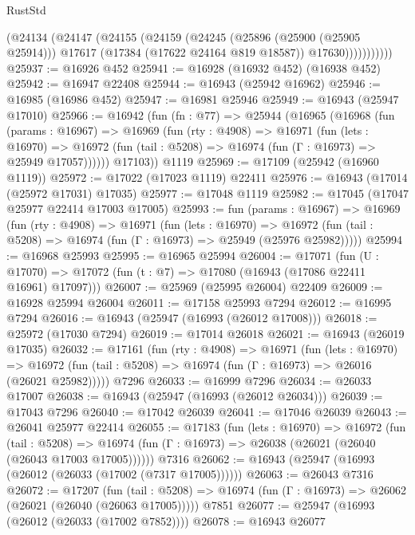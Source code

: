 \begin{lexlean}{RustStd}
\begin{coremodule}
                (@24134
                  (@24147
                    (@24155
                      (@24159
                        (@24245
                          (@25896 (@25900 (@25905 @25914)))
                          @17617
                          (@17384 (@17622 @24164 @819 @18587))
                          @17630)))))))))))
@25937 := @16926 @452
@25941 := @16928 (@16932 @452) (@16938 @452)
@25942 := @16947 @22408
@25944 := @16943 (@25942 @16962)
@25946 := @16985 (@16986 @452)
@25947 := @16981 @25946
@25949 := @16943 (@25947 @17010)
@25966 := @16942
    (fun (fn : @77) =>
    @25944
      (@16965
        (@16968
          (fun (params : @16967) =>
          @16969
            (fun (rty : @4908) =>
            @16971
              (fun (lets : @16970) =>
              @16972 (fun (tail : @5208) => @16974 (fun (Γ : @16973) => @25949 @17057))))))
        @17103))
    @1119
@25969 := @17109 (@25942 (@16960 @1119))
@25972 := @17022 (@17023 @1119) @22411
@25976 := @16943 (@17014 (@25972 @17031) @17035)
@25977 := @17048 @1119
@25982 := @17045 (@17047 @25977 @22414 @17003 @17005)
@25993 := fun (params : @16967) =>
  @16969
    (fun (rty : @4908) =>
    @16971
      (fun (lets : @16970) =>
      @16972 (fun (tail : @5208) => @16974 (fun (Γ : @16973) => @25949 (@25976 @25982)))))
@25994 := @16968 @25993
@25995 := @16965 @25994
@26004 := @17071
    (fun (U : @17070) => @17072 (fun (t : @7) => @17080 (@16943 (@17086 @22411 @16961) @17097)))
@26007 := @25969 (@25995 @26004) @22409
@26009 := @16928 @25994 @26004
@26011 := @17158 @25993 @7294
@26012 := @16995 @7294
@26016 := @16943 (@25947 (@16993 (@26012 @17008)))
@26018 := @25972 (@17030 @7294)
@26019 := @17014 @26018
@26021 := @16943 (@26019 @17035)
@26032 := @17161
    (fun (rty : @4908) =>
    @16971
      (fun (lets : @16970) =>
      @16972 (fun (tail : @5208) => @16974 (fun (Γ : @16973) => @26016 (@26021 @25982)))))
    @7296
@26033 := @16999 @7296
@26034 := @26033 @17007
@26038 := @16943 (@25947 (@16993 (@26012 @26034)))
@26039 := @17043 @7296
@26040 := @17042 @26039
@26041 := @17046 @26039
@26043 := @26041 @25977 @22414
@26055 := @17183
    (fun (lets : @16970) =>
    @16972
      (fun (tail : @5208) =>
      @16974 (fun (Γ : @16973) => @26038 (@26021 (@26040 (@26043 @17003 @17005))))))
    @7316
@26062 := @16943 (@25947 (@16993 (@26012 (@26033 (@17002 (@7317 @17005))))))
@26063 := @26043 @7316
@26072 := @17207
    (fun (tail : @5208) => @16974 (fun (Γ : @16973) => @26062 (@26021 (@26040 (@26063 @17005)))))
    @7851
@26077 := @25947 (@16993 (@26012 (@26033 (@17002 @7852))))
@26078 := @16943 @26077

\end{coremodule}
\end{lexlean}
